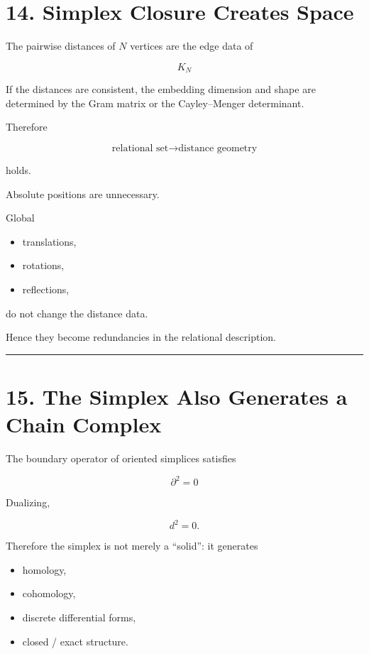\documentclass[
  a4paper,
]{article}
\providecommand{\tightlist}{%
  \setlength{\itemsep}{0pt}\setlength{\parskip}{0pt}}
\begin{document}
\section{14. Simplex Closure Creates
Space}\label{simplex-closure-creates-space}

The pairwise distances of \(N\) vertices are the edge data of

\[
K_N
\]

If the distances are consistent, the embedding dimension and shape are
determined by the Gram matrix or the Cayley--Menger determinant.

Therefore

\[
\boxed{
\text{relational set}
\to
\text{distance geometry}
}
\]

holds.

Absolute positions are unnecessary.

Global

\begin{itemize}
\tightlist
\item
  translations,
\item
  rotations,
\item
  reflections,
\end{itemize}

do not change the distance data.

Hence they become redundancies in the relational description.

\begin{center}\rule{0.5\linewidth}{0.5pt}\end{center}

\section{15. The Simplex Also Generates a Chain
Complex}\label{the-simplex-also-generates-a-chain-complex}

The boundary operator of oriented simplices satisfies

\[
\boxed{
\partial^2=0
}
\]

Dualizing,

\[
\boxed{
d^2=0
}.
\]

Therefore the simplex is not merely a ``solid'': it generates

\begin{itemize}
\tightlist
\item
  homology,
\item
  cohomology,
\item
  discrete differential forms,
\item
  closed / exact structure.
\end{itemize}
\end{document}
